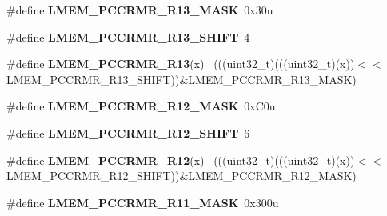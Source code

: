 \begin{DoxyCompactItemize}
\item 
\hypertarget{group___l_m_e_m___register___masks_ga5be0ce97ab437144756fc6b96983cca8}{}\#define {\bfseries L\+M\+E\+M\+\_\+\+P\+C\+C\+R\+M\+R\+\_\+\+R13\+\_\+\+M\+A\+S\+K}~0x30u\label{group___l_m_e_m___register___masks_ga5be0ce97ab437144756fc6b96983cca8}

\item 
\hypertarget{group___l_m_e_m___register___masks_gadde3ef27c8d0bd6eb6420b3cf100db28}{}\#define {\bfseries L\+M\+E\+M\+\_\+\+P\+C\+C\+R\+M\+R\+\_\+\+R13\+\_\+\+S\+H\+I\+F\+T}~4\label{group___l_m_e_m___register___masks_gadde3ef27c8d0bd6eb6420b3cf100db28}

\item 
\hypertarget{group___l_m_e_m___register___masks_gab7b6f3b14b172dac322a2d11cea5d700}{}\#define {\bfseries L\+M\+E\+M\+\_\+\+P\+C\+C\+R\+M\+R\+\_\+\+R13}(x)                                          ~(((uint32\+\_\+t)(((uint32\+\_\+t)(x))$<$$<$L\+M\+E\+M\+\_\+\+P\+C\+C\+R\+M\+R\+\_\+\+R13\+\_\+\+S\+H\+I\+F\+T))\&L\+M\+E\+M\+\_\+\+P\+C\+C\+R\+M\+R\+\_\+\+R13\+\_\+\+M\+A\+S\+K)\label{group___l_m_e_m___register___masks_gab7b6f3b14b172dac322a2d11cea5d700}

\item 
\hypertarget{group___l_m_e_m___register___masks_gad691aea16dc94000f0b02e77d7c97f95}{}\#define {\bfseries L\+M\+E\+M\+\_\+\+P\+C\+C\+R\+M\+R\+\_\+\+R12\+\_\+\+M\+A\+S\+K}~0x\+C0u\label{group___l_m_e_m___register___masks_gad691aea16dc94000f0b02e77d7c97f95}

\item 
\hypertarget{group___l_m_e_m___register___masks_ga21696f1368dba90de8560ed95cb9cdd5}{}\#define {\bfseries L\+M\+E\+M\+\_\+\+P\+C\+C\+R\+M\+R\+\_\+\+R12\+\_\+\+S\+H\+I\+F\+T}~6\label{group___l_m_e_m___register___masks_ga21696f1368dba90de8560ed95cb9cdd5}

\item 
\hypertarget{group___l_m_e_m___register___masks_ga4f4fd597395a6b0f418171d9adbb8c9e}{}\#define {\bfseries L\+M\+E\+M\+\_\+\+P\+C\+C\+R\+M\+R\+\_\+\+R12}(x)                                          ~(((uint32\+\_\+t)(((uint32\+\_\+t)(x))$<$$<$L\+M\+E\+M\+\_\+\+P\+C\+C\+R\+M\+R\+\_\+\+R12\+\_\+\+S\+H\+I\+F\+T))\&L\+M\+E\+M\+\_\+\+P\+C\+C\+R\+M\+R\+\_\+\+R12\+\_\+\+M\+A\+S\+K)\label{group___l_m_e_m___register___masks_ga4f4fd597395a6b0f418171d9adbb8c9e}

\item 
\hypertarget{group___l_m_e_m___register___masks_ga825bcb309a2cd82c5ed889f587ed3d34}{}\#define {\bfseries L\+M\+E\+M\+\_\+\+P\+C\+C\+R\+M\+R\+\_\+\+R11\+\_\+\+M\+A\+S\+K}~0x300u\label{group___l_m_e_m___register___masks_ga825bcb309a2cd82c5ed889f587ed3d34}


\end{DoxyCompactItemize}
